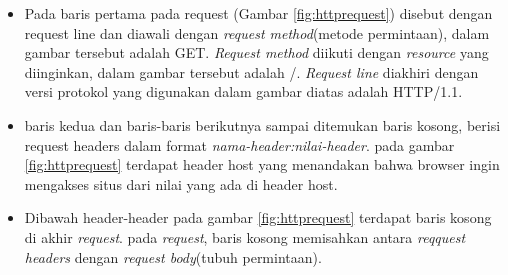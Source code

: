 \begin{itemize}
	\item Pada baris pertama pada request (Gambar \ref{fig:httprequest}) disebut dengan request line dan diawali dengan \textit{request method}(metode permintaan), dalam gambar tersebut adalah GET. \textit{Request method} diikuti dengan \textit{resource} yang diinginkan, dalam gambar tersebut adalah /. \textit{Request line} diakhiri dengan versi protokol yang digunakan dalam gambar diatas adalah HTTP/1.1.
	\item baris kedua dan baris-baris berikutnya sampai ditemukan baris kosong, berisi request headers dalam format \textit{nama-header:nilai-header}. pada gambar \ref{fig:httprequest} terdapat header host yang menandakan bahwa browser ingin mengakses situs dari nilai yang ada di header host.
	\item Dibawah header-header pada gambar \ref{fig:httprequest} terdapat baris kosong di akhir \textit{request}. pada \textit{request}, baris kosong memisahkan antara \textit{reqquest headers} dengan \textit{request body}(tubuh permintaan).
\end{itemize}

